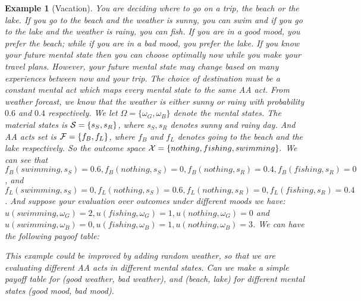 \documentclass[11pt,oneside]{article}
\theoremstyle{plain}
\theoremstyle{plain}
\newtheorem{example}{Example}[section]
\theoremstyle{plain}
\theoremstyle{plain}
\theoremstyle{plain}
\theoremstyle{definition}
\theoremstyle{definition}
\theoremstyle{remark}
\theoremstyle{plain}
\newcommand{\F}{{\cal F}}
\newcommand{\mcs}{{\cal S}}
\newcommand{\mcx}{{\cal X}}
\newcommand{\wh}[1]{{\color{blue} #1     }}
\begin{document}
\begin{example}[Vacation]
You are deciding where to go on a trip, the beach or the lake. If you go to the beach and the weather is sunny, you can swim and if you go to the lake
and the weather is rainy, you can fish.
If you are in a good mood, you prefer the beach; while if you are in a bad mood,
you prefer the lake. If you know your future mental state then you can choose optimally now while you make your travel plans. 
However, your future mental state may change based on many experiences between now and your trip. 
The choice of destination must be a constant mental act which maps every mental state to the same AA act.
From weather forcast, we know that the weather is either sunny or rainy with probability $0.6$ and $0.4$ respectively.
We let $\Omega = \{\omega_G,\omega_B\}$ denote the mental states. The material states is $\mcs = \{s_S,s_R \}$, where $s_S,s_R$ denotes sunny and rainy day.
And AA acts set is $\F = \{f_B, f_L  \}$, where $f_B$ and $f_L$ denotes going to the beach and the lake respectively.
So the outcome space $\mcx = \{ nothing, fishing, swimming \}.$ We can see that $f_B(swimming, s_S) = 0.6, f_B(nothing, s_S)= 0, f_B(nothing,s_R) = 0.4, f_B(fishing,s_R) = 0$, and
$f_L(swimming, s_S) = 0, f_L(nothing, s_S)= 0.6, f_L(nothing,s_R) = 0, f_L(fishing,s_R) = 0.4$. And suppose your evaluation over outcomes under different moods we have:
$u(swimming, \omega_G) = 2,u(fishing,\omega_G) = 1, u(nothing,\omega_G) = 0$ and $u(swimming, \omega_B) = 0,u(fishing,\omega_B) = 1, u(nothing,\omega_B) = 3$.
We can have the following payoof table:
\begin{table}[htbp]
\centering
{}
\caption{Payoff Table for Vacation Example}
\label{tab:payoff}
\end{table}

\wh{This example could be improved by adding random weather, so that we are evaluating different AA acts in different mental states. Can we make a simple payoff table for (good weather, bad weather), and (beach, lake) for different mental states (good mood, bad mood).}
\end{example}
\end{document}
